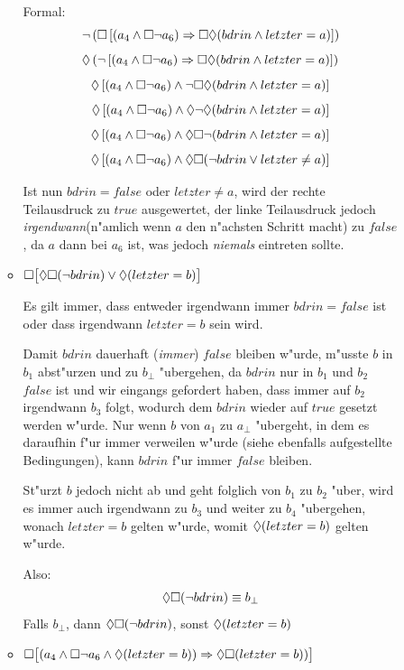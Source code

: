 \documentclass[a4paper,twoside,12pt]{article}
\begin{document}
\begin{description}
\begin{enumerate}
\begin{itemize}
		Formal:
		\[ \neg\left(\Box\left[(a_4\wedge\Box\neg a_6)\Rightarrow\Box\lozenge(bdrin\wedge letzter=a)\right]\right) \]
		\[ \lozenge\left(\neg\left[(a_4\wedge\Box\neg a_6)\Rightarrow\Box\lozenge(bdrin\wedge letzter=a)\right]\right) \]
		\[ \lozenge\left[(a_4\wedge\Box\neg a_6)\wedge\neg\Box\lozenge(bdrin\wedge letzter=a)\right] \]
		\[ \lozenge\left[(a_4\wedge\Box\neg a_6)\wedge\lozenge\neg\lozenge(bdrin\wedge letzter=a)\right] \]
		\[ \lozenge\left[(a_4\wedge\Box\neg a_6)\wedge\lozenge\Box\neg(bdrin\wedge letzter=a)\right] \]
		\[ \lozenge\left[(a_4\wedge\Box\neg a_6)\wedge\lozenge\Box(\neg bdrin\vee letzter\neq a)\right] \]

		Ist nun $bdrin = false$ oder $letzter \neq a$, wird der rechte Teilausdruck zu
		$true$ ausgewertet, der linke Teilausdruck jedoch \emph{irgendwann}(n"amlich wenn $a$ den
		n"achsten Schritt macht) zu $false$, da $a$ dann bei $a_6$ ist, was jedoch \emph{niemals}
		eintreten sollte.

		\item $\Box \big [\lozenge \Box (\neg bdrin) \vee \lozenge (letzter = b) \big]$

		Es gilt immer, dass entweder irgendwann immer $bdrin = false$ ist oder dass irgendwann
		$letzter = b$ sein wird.

		Damit $bdrin$ dauerhaft (\emph{immer}) $false$ bleiben w"urde, m"usste $b$ in
		$b_1$ abst"urzen und zu $b_\bot$ "ubergehen, da $bdrin$ nur in $b_1$ und $b_2$
		$false$ ist und wir eingangs gefordert haben, dass immer auf $b_2$ irgendwann
		$b_3$ folgt, wodurch dem $bdrin$ wieder auf $true$ gesetzt werden w"urde. Nur
		wenn $b$ von $a_1$ zu $a_\bot$ "ubergeht, in dem es daraufhin f"ur immer verweilen
		w"urde (siehe ebenfalls aufgestellte Bedingungen), kann $bdrin$ f"ur immer
		$false$ bleiben.

		St"urzt $b$ jedoch nicht ab und geht folglich von $b_1$ zu $b_2$ "uber, wird
		es immer auch irgendwann zu $b_3$ und weiter zu $b_4$ "ubergehen, wonach
		$letzter = b$ gelten w"urde, womit $\lozenge (letzter = b)$ gelten w"urde.

		Also:
		\[ \lozenge\Box(\neg bdrin) \equiv b_\bot \]
		Falls $b_\bot$, dann $\lozenge\Box(\neg bdrin)$,
		sonst $\lozenge (letzter = b)$

		\item $\Box \big [(a_4 \wedge \Box \neg a_6 \wedge \lozenge (letzter = b)) \Rightarrow \lozenge \Box (letzter = b)) \big ]$

	\end{itemize}
\begin{verbatim}



\end{verbatim}
\end{enumerate}
\end{description}
\end{document}
